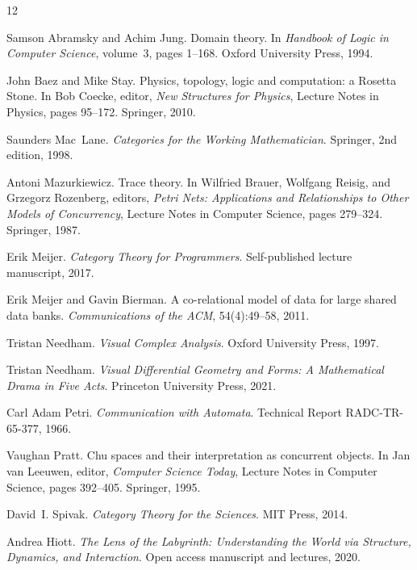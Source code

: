\documentclass[12pt]{article}
\theoremstyle{plain}
\theoremstyle{definition}
\theoremstyle{remark}
\begin{document}
\newpage

\begin{thebibliography}{12}

Samson Abramsky and Achim Jung.
Domain theory.
In \textit{Handbook of Logic in Computer Science}, volume~3, pages 1--168.
Oxford University Press, 1994.

John Baez and Mike Stay.
Physics, topology, logic and computation: a Rosetta Stone.
In Bob Coecke, editor, \textit{New Structures for Physics},
Lecture Notes in Physics, pages 95--172.
Springer, 2010.

Saunders Mac~Lane.
\textit{Categories for the Working Mathematician}.
Springer, 2nd edition, 1998.

Antoni Mazurkiewicz.
Trace theory.
In Wilfried Brauer, Wolfgang Reisig, and Grzegorz Rozenberg, editors,
\textit{Petri Nets: Applications and Relationships to Other Models of Concurrency},
Lecture Notes in Computer Science, pages 279--324.
Springer, 1987.

Erik Meijer.
\textit{Category Theory for Programmers}.
Self-published lecture manuscript, 2017.

Erik Meijer and Gavin Bierman.
A co-relational model of data for large shared data banks.
\textit{Communications of the ACM}, 54(4):49--58, 2011.

Tristan Needham.
\textit{Visual Complex Analysis}.
Oxford University Press, 1997.

Tristan Needham.
\textit{Visual Differential Geometry and Forms: A Mathematical Drama in Five Acts}.
Princeton University Press, 2021.

Carl Adam Petri.
\textit{Communication with Automata}.
Technical Report RADC-TR-65-377, 1966.

Vaughan Pratt.
Chu spaces and their interpretation as concurrent objects.
In Jan van Leeuwen, editor, \textit{Computer Science Today},
Lecture Notes in Computer Science, pages 392--405.
Springer, 1995.

David~I. Spivak.
\textit{Category Theory for the Sciences}.
MIT Press, 2014.

Andrea Hiott.
\textit{The Lens of the Labyrinth: Understanding the World via Structure,
Dynamics, and Interaction}.
Open access manuscript and lectures, 2020.


\end{thebibliography}
\end{document}
